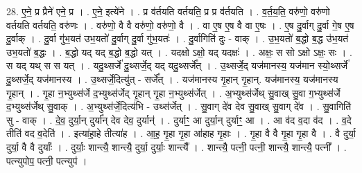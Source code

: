 \documentclass[17pt]{extarticle}
\begin{document}
28. ए॒ने॒ प्र प्रैने॑ एने॒ प्र । . ए॒ने॒ इत्ये॑ने । . प्र व॑र्तयति वर्तयति॒ प्र प्र व॑र्तयति । . व॒र्त॒य॒ति॒ वरु॑णो॒ वरु॑णो वर्तयति वर्तयति॒ वरु॑णः । . वरु॑णो॒ वै वै वरु॑णो॒ वरु॑णो॒ वै । . वा ए॒ष ए॒ष वै वा ए॒षः । . ए॒ष दु॒र्वाग् दु॒र्वा गे॒ष ए॒ष दु॒र्वाक् । . दु॒र्वा गु॑भ॒यत॑ उभ॒यतो॑ दु॒र्वाग् दु॒र्वा गु॑भ॒यतः॑ । . दु॒र्वागिति॑ दुः - वाक् । . उ॒भ॒यतो॑ ब॒द्धो ब॒द्ध उ॑भ॒यत॑ उभ॒यतो॑ ब॒द्धः । . ब॒द्धो यद् यद् ब॒द्धो ब॒द्धो यत् । . यदक्षो ऽक्षो॒ यद् यदक्षः॑ । . अक्षः॒ स सो ऽक्षो ऽक्षः॒ सः । . स यद् यथ् स स यत् । . यदु॒थ्सर्जे॑ दु॒थ्सर्जे॒द् यद् यदु॒थ्सर्जे᳚त् । . उ॒थ्सर्जे॒द् यज॑मानस्य॒ यज॑मान स्यो॒थ्सर्जे॑ दु॒थ्सर्जे॒द् यज॑मानस्य । . उ॒थ्सर्जे॒दित्यु॑त् - सर्जे᳚त् । . यज॑मानस्य गृ॒हान् गृ॒हान्. यज॑मानस्य॒ यज॑मानस्य गृ॒हान् । . गृ॒हा न॒भ्युथ्स॑र्जे द॒भ्युथ्स॑र्जेद् गृ॒हान् गृ॒हा न॒भ्युथ्स॑र्जेत् । . अ॒भ्युथ्स॑र्जेथ् सु॒वाख् सु॒वा ग॒भ्युथ्स॑र्जे द॒भ्युथ्स॑र्जेथ् सु॒वाक् । . अ॒भ्युथ्स॑र्जे॒दित्य॑भि - उथ्स॑र्जेत् । . सु॒वाग् दे॑व देव सु॒वाख् सु॒वाग् दे॑व । . सु॒वागिति॑ सु - वाक् । . दे॒व॒ दुर्या॒न् दुर्या᳚न् देव देव॒ दुर्यान्॑ । . दुर्याꣳ॒॒ आ दुर्या॒न् दुर्याꣳ॒॒ आ । . आ व॑द व॒दा व॑द । . व॒दे तीति॑ वद व॒देति॑ । . इत्या॑हा॒हे तीत्या॑ह । . आ॒ह॒ गृ॒हा गृ॒हा आ॑हाह गृ॒हाः । . गृ॒हा वै वै गृ॒हा गृ॒हा वै । . वै दुर्या॒ दुर्या॒ वै वै दुर्याः᳚ । . दुर्याः॒ शान्त्यै॒ शान्त्यै॒ दुर्या॒ दुर्याः॒ शान्त्यै᳚ । . शान्त्यै॒ पत्नी॒ पत्नी॒ शान्त्यै॒ शान्त्यै॒ पत्नी᳚ । . पत्न्युपोप॒ पत्नी॒ पत्न्युप॑ । \newline
\end{document}
